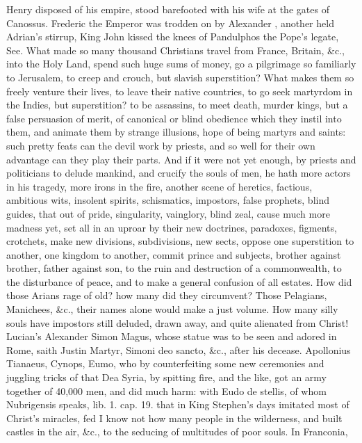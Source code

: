 {Henry  disposed of his empire, stood barefooted with his wife
at the gates of Canossus. Frederic the Emperor was trodden on by
Alexander , another held Adrian's stirrup, King John kissed the
knees of Pandulphos the Pope's legate, See. What made so many thousand
Christians travel from France, Britain, \&c., into the Holy Land, spend
such huge sums of money, go a pilgrimage so familiarly to Jerusalem, to
creep and crouch, but slavish superstition? What makes them so freely
venture their lives, to leave their native countries, to go seek
martyrdom in the Indies, but superstition? to be assassins, to meet
death, murder kings, but a false persuasion of merit, of canonical or
blind obedience which they instil into them, and animate them by
strange illusions, hope of being martyrs and saints: such pretty feats
can the devil work by priests, and so well for their own advantage can
they play their parts. And if it were not yet enough, by priests and
politicians to delude mankind, and crucify the souls of men, he hath
more actors in his tragedy, more irons in the fire, another scene of
heretics, factious, ambitious wits, insolent spirits, schismatics,
impostors, false prophets, blind guides, that out of pride,
singularity, vainglory, blind zeal, cause much more madness yet, set
all in an uproar by their new doctrines, paradoxes, figments,
crotchets, make new divisions, subdivisions, new sects, oppose one
superstition to another, one kingdom to another, commit prince and
subjects, brother against brother, father against son, to the ruin and
destruction of a commonwealth, to the disturbance of peace, and to make
a general confusion of all estates. How did those Arians rage of old?
how many did they circumvent? Those Pelagians, Manichees, \&c., their
names alone would make a just volume. How many silly souls have
impostors still deluded, drawn away, and quite alienated from Christ!
Lucian's Alexander Simon Magus, whose statue was to be seen and adored
in Rome, saith Justin Martyr, Simoni deo sancto, \&c., after his
decease. Apollonius Tianaeus, Cynops, Eumo, who by counterfeiting
some new ceremonies and juggling tricks of that Dea Syria, by spitting
fire, and the like, got an army together of 40,000 men, and did much
harm: with Eudo de stellis, of whom Nubrigensis speaks, lib. 1. cap.
19. that in King Stephen's days imitated most of Christ's miracles, fed
I know not how many people in the wilderness, and built castles in the
air, \&c., to the seducing of multitudes of poor souls. In Franconia,
}
